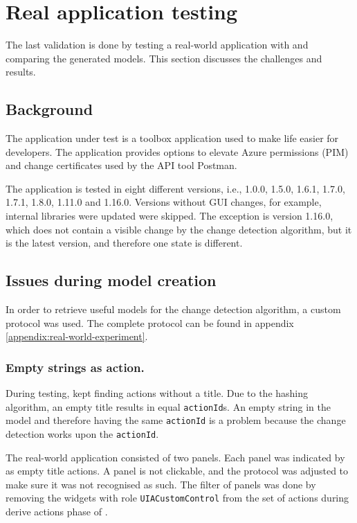 \section{Real application testing} \label{sec:real-application}
The last validation is done by testing a real-world application with \testar and comparing the generated models. This section discusses the challenges and results. 

\subsection{Background}
The application under test is a toolbox application used to make life easier for developers. The application provides options to elevate Azure permissions (PIM) and change certificates used by the API tool Postman. 

The application is tested in eight different versions, i.e., 1.0.0, 1.5.0, 1.6.1, 1.7.0, 1.7.1, 1.8.0, 1.11.0 and 1.16.0. Versions without GUI changes, for example, internal libraries were updated were skipped. The exception is version 1.16.0, which does not contain a visible change by the change detection algorithm, but it is the latest version, and therefore one state is different. 

\subsection{Issues during model creation}
In order to retrieve useful models for the change detection algorithm, a custom protocol was used. The complete protocol can be found in appendix \ref{appendix:real-world-experiment}.

\subsubsection{Empty strings as action.}
During testing, \testar kept finding actions without a title. Due to the \testar hashing algorithm, an empty title results in equal \verb|actionId|s. An empty string in the model and therefore having the same \verb|actionId| is a problem because the change detection works upon the \verb|actionId|. 

The real-world application consisted of two panels. Each panel was indicated by \testar as empty title actions. A panel is not clickable, and the protocol was adjusted to make sure it was not recognised as such. The filter of panels was done by removing the widgets with role \verb|UIACustomControl| from the set of actions during derive actions phase of \testar. 

